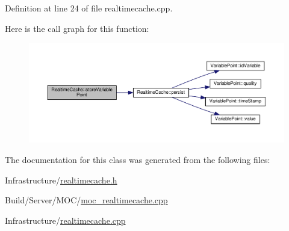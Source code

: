 Definition at line 24 of file realtimecache.\+cpp.



Here is the call graph for this function\+:
\nopagebreak
\begin{figure}[H]
\begin{center}
\leavevmode
\includegraphics[width=350pt]{class_realtime_cache_a9fec88a36d7db8d20bdaa33313efb79e_cgraph}
\end{center}
\end{figure}




The documentation for this class was generated from the following files\+:\begin{DoxyCompactItemize}
\item 
Infrastructure/\hyperlink{realtimecache_8h}{realtimecache.\+h}\item 
Build/\+Server/\+M\+O\+C/\hyperlink{moc__realtimecache_8cpp}{moc\+\_\+realtimecache.\+cpp}\item 
Infrastructure/\hyperlink{realtimecache_8cpp}{realtimecache.\+cpp}\end{DoxyCompactItemize}
